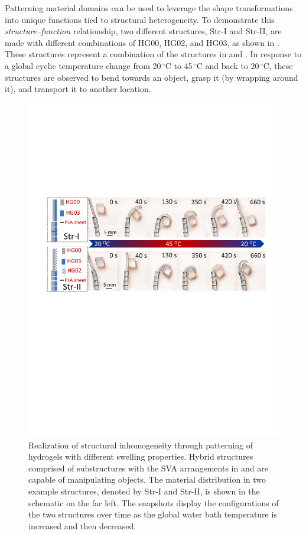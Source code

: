 Patterning material domains can be used to leverage the shape transformations into unique functions tied to structural heterogeneity. To demonstrate this \textit{structure--function} relationship, two different structures, Str-I and Str-II, are made with different combinations of HG00, HG02, and HG03, as shown in . These structures represent a combination of the structures in  and . In response to a global cyclic temperature change from 20\,$^{\circ}$C to 45\,$^{\circ}$C and back to 20\,$^{\circ}$C, these structures are observed to bend towards an object, grasp it (by wrapping around it), and transport it to another location. 
\begin{figure}[!ht]
\centering
\includegraphics[width=\textwidth]{hardcodedrobot.pdf}
\caption[]{Realization of structural inhomogeneity through patterning of hydrogels with different swelling properties. Hybrid structures comprised of substructures with the SVA arrangements in  and  are capable of manipulating objects. The material distribution in two example structures, denoted by Str-I and Str-II, is shown in the schematic on the far left. The snapshots display the configurations of the two structures over time as the global water bath temperature is increased and then decreased.}
\label{fig:hardcodedrobot}
\end{figure}

